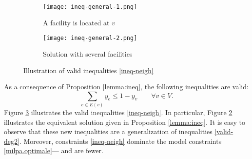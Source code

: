 \documentclass[review]{elsarticle}
\theoremstyle{definition}
\begin{document}
\begin{figure}
	\begin{subfigure}{0.5\textwidth}
    	\centering
    	\texttt{[image: ineq-general-1.png]}
    	\caption{A facility is located at $v$}
    	\label{fig:generala}
	\end{subfigure}
 	\begin{subfigure}{0.5\textwidth}
    	\centering
    	\texttt{[image: ineq-general-2.png]}
    	\caption{Solution with several facilities}
    	\label{fig:generalb}
	\end{subfigure}
	\caption{Illustration of valid inequalities \eqref{ineq-neigh}}
	\label{fig:general}
\end{figure}
As a consequence of Proposition \ref{lemma:ineq}, the following inequalities are valid:
\begin{equation}
	\sum_{e\in E(v)} y_e \leq 1-y_v \qquad \forall v\in V. \label{ineq-neigh}
\end{equation}
Figure \ref{fig:general} illustrates the valid inequalities \eqref{ineq-neigh}. In particular, Figure \ref{fig:generalb} illustrates the equivalent solution given in Proposition \ref{lemma:ineq}. It is easy to observe that these new inequalities are a generalization of inequalities \eqref{valid-deg2}. Moreover, constraints \eqref{ineq-neigh} dominate the model constraints  \eqref{milpa.optimale}--- and are fewer.
\end{document}
